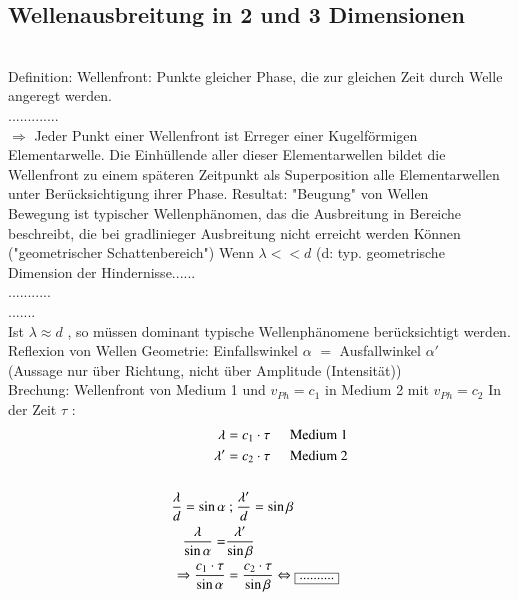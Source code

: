\subsection{Wellenausbreitung in 2 und 3 Dimensionen} \hfill\\
Definition: Wellenfront: Punkte gleicher Phase, die zur gleichen Zeit durch Welle angeregt werden. \\
.............\\
$ \Rightarrow $ Jeder Punkt einer Wellenfront ist Erreger einer Kugelförmigen Elementarwelle. Die Einhüllende aller dieser Elementarwellen bildet die Wellenfront zu einem späteren Zeitpunkt als Superposition alle Elementarwellen unter Berücksichtigung ihrer Phase.
\bild
\bild
Resultat: "Beugung" von Wellen \\
Bewegung ist typischer Wellenphänomen, das die Ausbreitung in Bereiche beschreibt, die bei gradlinieger Ausbreitung nicht erreicht werden Können ("geometrischer Schattenbereich")
\bild
Wenn $ \lambda << d $ (d: typ. geometrische Dimension der Hindernisse......\\
...........\\
.......\\
Ist $ \lambda \approx d$ , so müssen dominant typische Wellenphänomene berücksichtigt werden.\\
Reflexion von Wellen
\bild
{}
Geometrie: Einfallswinkel $ \alpha $ $ = $ Ausfallwinkel $ \alpha' $\\
(Aussage nur über Richtung, nicht über Amplitude (Intensität))\\
Brechung: Wellenfront von Medium 1 und $ v_{Ph} = c_1 $ in Medium 2 mit $ v_{Ph} = c_2 $
\bild
In der Zeit $ \tau $ : \begin{align*}
\lambda &= c_1 \cdot \tau \hspace{5mm} \text{Medium 1}\\
\lambda' &= c_2 \cdot \tau \hspace{5mm} \text{Medium 2}\\
\hfill\\
\frac{\lambda}{d} = \sin\alpha& \text{ ; } \frac{\lambda'}{d} = \sin\beta\\
\frac{\lambda}{\sin\alpha} =& \frac{\lambda'}{\sin\beta}\\
\Rightarrow \frac{c_1 \cdot \tau}{\sin\alpha} &= \frac{c_2 \cdot \tau}{\sin\beta} \Leftrightarrow \boxed{..........}
\end{align*}

